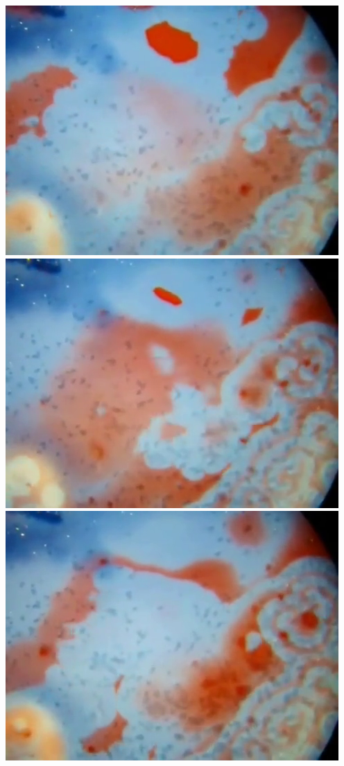 \documentclass[12pt]{report}
\begin{document}
{\includegraphics[scale=0.25]{BZ-frames0018.png}
\includegraphics[scale=0.25]{BZ-frames0019.png}
\includegraphics[scale=0.25]{BZ-frames0020.png}
}
\end{document}
